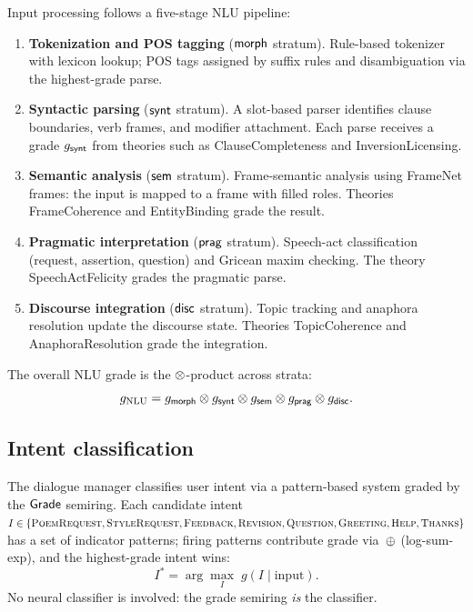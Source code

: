 Input processing follows a five-stage NLU pipeline:
\begin{enumerate}
  \item \textbf{Tokenization and POS tagging}\; ($\mathsf{morph}$ stratum).
        Rule-based tokenizer with lexicon lookup; POS tags assigned by
        suffix rules and disambiguation via the highest-grade parse.
  \item \textbf{Syntactic parsing}\; ($\mathsf{synt}$ stratum).
        A slot-based parser identifies clause boundaries, verb frames,
        and modifier attachment.  Each parse receives a grade
        $g_{\mathsf{synt}}$ from theories such as \textsf{ClauseCompleteness}
        and \textsf{InversionLicensing}.
  \item \textbf{Semantic analysis}\; ($\mathsf{sem}$ stratum).
        Frame-semantic analysis using FrameNet frames: the input is
        mapped to a frame with filled roles.  Theories
        \textsf{FrameCoherence} and \textsf{EntityBinding} grade the
        result.
  \item \textbf{Pragmatic interpretation}\; ($\mathsf{prag}$ stratum).
        Speech-act classification (request, assertion, question) and
        Gricean maxim checking.  The theory \textsf{SpeechActFelicity}
        grades the pragmatic parse.
  \item \textbf{Discourse integration}\; ($\mathsf{disc}$ stratum).
        Topic tracking and anaphora resolution update the discourse
        state.  Theories \textsf{TopicCoherence} and
        \textsf{AnaphoraResolution} grade the integration.
\end{enumerate}

The overall NLU grade is the $\otimes$-product across strata:
\begin{equation}
\label{eq:nlu-grade}
  g_{\mathrm{NLU}} = g_{\mathsf{morph}} \otimes g_{\mathsf{synt}} \otimes g_{\mathsf{sem}}
    \otimes g_{\mathsf{prag}} \otimes g_{\mathsf{disc}}.
\end{equation}

\subsection{Intent classification}
\label{ssec:intent}

The dialogue manager classifies user intent via a pattern-based
system graded by the $\mathsf{Grade}$ semiring.  Each candidate intent
$I \in \{\textsc{PoemRequest}, \textsc{StyleRequest},
\textsc{Feedback}, \textsc{Revision}, \textsc{Question},
\textsc{Greeting}, \textsc{Help}, \textsc{Thanks}\}$ has a set of
indicator patterns; firing patterns contribute grade via~$\oplus$
(log-sum-exp), and the highest-grade intent wins:
\begin{equation}
\label{eq:intent-grade}
  I^* = \arg\max_I \; g(I \mid \text{input}).
\end{equation}
No neural classifier is involved: the grade semiring \emph{is} the
classifier.

